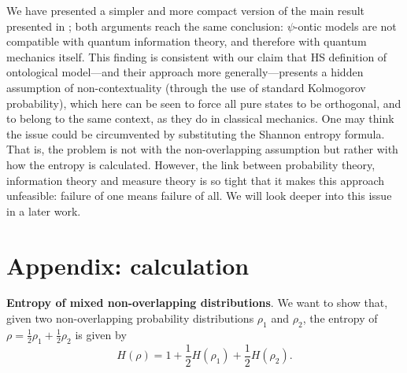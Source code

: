 \documentclass[10pt,twocolumn, nofootinbib]{revtex4-1}
\begin{document}
We have presented a simpler and more compact version of the main result presented in \cite{Carcassi:2022}; both arguments reach the same conclusion: $\psi$-ontic models are not compatible with quantum information theory, and therefore with quantum mechanics itself. This finding is consistent with our claim that HS definition of ontological model---and their approach more generally---presents a hidden assumption of non-contextuality (through the use of standard Kolmogorov probability), which here can be seen to force all pure states to be orthogonal, and to belong to the same context, as they do in classical mechanics. 
One may think the issue could be circumvented by substituting the Shannon entropy formula. That is, the problem is not with the non-overlapping assumption but rather with how the entropy is calculated. However, the link between probability theory, information theory and measure theory is so tight that it makes this approach unfeasible: failure of one means failure of all. We will look deeper into this issue in a later work.



\clearpage

\section*{Appendix: calculation}
\label{A}
\textbf{Entropy of mixed non-overlapping distributions}. We want to show that, given two non-overlapping probability distributions $\rho_1$ and $\rho_2$, the entropy of $\rho = \frac{1}{2} \rho_1 + \frac{1}{2} \rho_2$ is given by
\begin{equation}
	H(\rho) = 1 + \frac{1}{2} H(\rho_1) + \frac{1}{2} H(\rho_2).
\end{equation}
\end{document}
